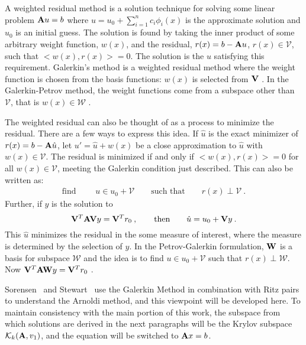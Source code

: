 A weighted residual method is a solution technique for solving some linear problem $\mathbf{A}u = b$ where $u = u_0 + \sum_{i=1}^{n} c_i \phi_i(x)$ is the approximate solution and $u_{0}$ is an initial guess. The solution is found by taking the inner product of some arbitrary weight function, $w(x)$, and the residual, $r(x) = b - \mathbf{A}u$, $r(x) \in \mathcal{V}$, such that $<w(x), r(x)> = 0$. The solution is the $u$ satisfying this requirement. Galerkin's method is a weighted residual method where the weight function is chosen from the basis functions: $w(x)$ is selected from $\mathbf{V}$ \cite{Matthews2005}. In the Galerkin-Petrov method, the weight functions come from a subspace other than $\mathcal{V}$, that is $w(x) \in \mathcal{W}$ \cite{Skeel2006}. 

The weighted residual can also be thought of as a process to minimize the residual. There are a few ways to express this idea. If $\hat{u}$ is the exact minimizer of $r(x) = b - \mathbf{A}\hat{u}$, let $u' = \hat{u} + w(x)$ be a close approximation to $\hat{u}$ with $w(x) \in \mathcal{V}$. The residual is minimized if and only if $<w(x), r(x)> = 0$ for all $w(x) \in \mathcal{V}$, meeting the Galerkin condition just described. This can also be written as: 
%
\begin{align}
  \text{find } \qquad u \in u_{0} + \mathcal{V} \qquad \text{such that} \qquad r(x) \perp \mathcal{V} \:.
  \label{eq:galerkinMin}
\end{align}
%
Further, if $y$ is the solution to
\begin{equation}
  \mathbf{V}^{T}\mathbf{AV}y = \mathbf{V}^{T} r_{0} \:, \qquad \text{then} \qquad \hat{u} = u_{0} + \mathbf{V}y \:.
  \label{eq:minResidual}
\end{equation}
This $\hat{u}$ minimizes the residual in the some measure of interest, where the measure is determined by the selection of $y$. In the Petrov-Galerkin formulation, $\mathbf{W}$ is a basis for subspace $\mathcal{W}$ and the idea is to find $ u \in u_{0} + \mathcal{V}$ such that $r(x) \perp \mathcal{W}$. Now $\mathbf{V}^T\mathbf{AW}y = \mathbf{V}^T r_0$ \cite{Skeel2006}.

Sorensen~\cite{Sorensen1996} and Stewart~\cite{Stewart 2001} use the Galerkin Method in combination with Ritz pairs to understand the Arnoldi method, and this viewpoint will be developed here. To maintain consistency with the main portion of this work, the subspace from which solutions are derived in the next paragraphs will be the Krylov subspace $\mathcal{K}_{k}(\mathbf{A},v_{1})$, and the equation will be switched to $\mathbf{A}x = b$.

